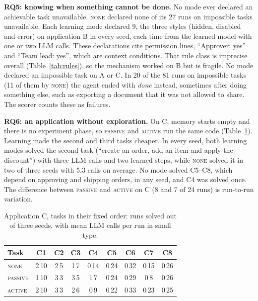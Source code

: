 \documentclass[conference]{IEEEtran}
\newcommand{\modeNone}{\textsc{none}}
\newcommand{\modePassive}{\textsc{passive}}
\newcommand{\modeActive}{\textsc{active}}
\begin{document}
\textbf{RQ5: knowing when something cannot be done.} %
No mode ever declared an achievable task unavailable. \modeNone{} declared none of its 27 runs on impossible tasks unavailable. Each learning mode declared 9, the three styles (hidden, disabled and error) on application B in every seed, each time from the learned model with one or two LLM calls. These declarations cite permission lines, ``Approver: yes'' and ``Team lead: yes'', which are context conditions. That rule class is imprecise overall (Table~\ref{tab:rules}), so the mechanism worked on B but is fragile. No mode declared an impossible task on A or C. In 20 of the 81 runs on impossible tasks (11 of them by \modeNone{}) the agent ended with \emph{done} instead, sometimes after doing something else, such as exporting a document that it was not allowed to share. The scorer counts these as failures.

\textbf{RQ6: an application without exploration.} %
On C, memory starts empty and there is no experiment phase, so \modePassive{} and \modeActive{} run the same code (Table~\ref{tab:curve}). Learning made the second and third tasks cheaper. In every seed, both learning modes solved the second task (``create an order, add an item and apply the discount'') with three LLM calls and two learned steps, while \modeNone{} solved it in two of three seeds with 5.3 calls on average. No mode solved C5--C8, which depend on approving and shipping orders, in any seed, and C4 was solved once. The difference between \modePassive{} and \modeActive{} on C (8 and 7 of 24 runs) is run-to-run variation.

\begin{table}[t]
\centering
\caption{Application C, tasks in their fixed order: runs solved out of three seeds, with mean LLM calls per run in small type.}
\label{tab:curve}
\setlength{\tabcolsep}{2.6pt}
\begin{tabular}{l cccccccc}
\toprule
Task & C1 & C2 & C3 & C4 & C5 & C6 & C7 & C8 \\
\midrule
\modeNone    & 2\,{\scriptsize 10} & 2\,{\scriptsize 5} & 1\,{\scriptsize 7} & 0\,{\scriptsize 14} & 0\,{\scriptsize 24} & 0\,{\scriptsize 32} & 0\,{\scriptsize 15} & 0\,{\scriptsize 26} \\
\modePassive & 1\,{\scriptsize 10} & 3\,{\scriptsize 3} & 3\,{\scriptsize 5} & 1\,{\scriptsize 7} & 0\,{\scriptsize 24} & 0\,{\scriptsize 29} & 0\,{\scriptsize 8} & 0\,{\scriptsize 26} \\
\modeActive  & 2\,{\scriptsize 10} & 3\,{\scriptsize 3} & 2\,{\scriptsize 6} & 0\,{\scriptsize 9} & 0\,{\scriptsize 22} & 0\,{\scriptsize 33} & 0\,{\scriptsize 23} & 0\,{\scriptsize 25} \\
\bottomrule
\end{tabular}
\end{table}
\end{document}
